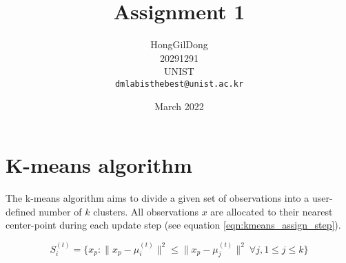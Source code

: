 \documentclass{article}
\title{Assignment 1}
\date{March 2022}
\author{%
  HongGilDong \\ %
  20291291\\%
  UNIST\\
  \texttt{dmlabisthebest@unist.ac.kr} \\%
}
\begin{document}


\maketitle %

\section{K-means algorithm} %
The k-means algorithm aims to divide a given set of observations into a user-defined number of $k$ clusters. All observations $x$ are allocated to their nearest center-point during each update step (see equation \eqref{eqn:kmeans_assign_step}). %

\begin{equation}
S_i^{(t)} = \big \{ x_p : \big \| x_p - \mu^{(t)}_i \big \|^2 \le \big \| x_p - \mu^{(t)}_j \big \|^2 \ \forall j, 1 \le j \le k \big\}
\label{eqn:kmeans_assign_step}
\end{equation}

\end{document}
